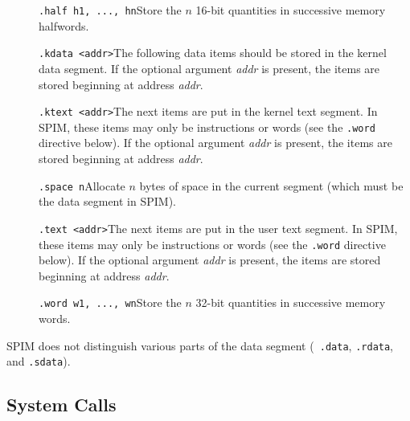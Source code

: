 \begin{description}
  \item [] {\tt .half h1, ..., hn}\newline Store the $n$ 16-bit
quantities in successive memory halfwords.

  \item [] {\tt .kdata <addr>}\newline The following data items should
be stored in the kernel data segment. If the optional argument {\em
addr\/} is present, the items are stored beginning at address {\em
addr\/}.

  \item [] {\tt .ktext <addr>}\newline The next items are put in the
kernel text segment.  In SPIM, these items may only be instructions or
words (see the {\tt .word} directive below). If the optional argument
{\em addr\/} is present, the items are stored beginning at address
{\em addr\/}.

  \item [] {\tt .space n}\newline Allocate $n$ bytes of space in the
current segment (which must be the data segment in SPIM).

  \item [] {\tt .text <addr>}\newline The next items are put in the
user text segment.  In SPIM, these items may only be instructions or
words (see the {\tt .word} directive below).  If the optional argument
{\em addr\/} is present, the items are stored beginning at address
{\em addr\/}.

  \item [] {\tt .word w1, ..., wn}\newline Store the $n$ 32-bit
quantities in successive memory words.
\end{description}
SPIM does not distinguish various parts of the data segment ({\tt
.data}, {\tt .rdata}, and {\tt .sdata}).

\subsection{System Calls}
\label{sec:scall}

